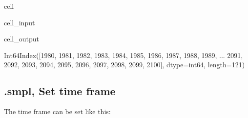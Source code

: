 \documentclass[letterpaper,10pt,english]{jupyterBook}
\begin{document}
\begin{sphinxuseclass}{cell}\begin{sphinxVerbatimInput}

\begin{sphinxuseclass}{cell_input}
\begin{sphinxVerbatim}[commandchars=\\\{\}]
  
\end{sphinxVerbatim}

\end{sphinxuseclass}\end{sphinxVerbatimInput}
\begin{sphinxVerbatimOutput}

\begin{sphinxuseclass}{cell_output}
\begin{sphinxVerbatim}[commandchars=\\\{\}]
Int64Index([1980, 1981, 1982, 1983, 1984, 1985, 1986, 1987, 1988, 1989,
            ...
            2091, 2092, 2093, 2094, 2095, 2096, 2097, 2098, 2099, 2100],
           dtype=\PYGZsq{}int64\PYGZsq{}, length=121)
\end{sphinxVerbatim}

\end{sphinxuseclass}\end{sphinxVerbatimOutput}

\end{sphinxuseclass}

\subsection{.smpl, Set time frame}
\label{\detokenize{content/notebooks/modelflow_features:smpl-set-time-frame}}
\sphinxAtStartPar
The time frame can be set like this:
\end{document}
